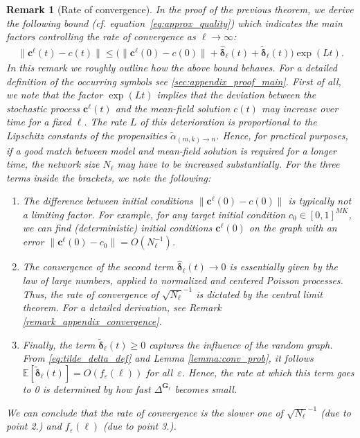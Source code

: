 \documentclass[a4paper,
               10pt,
               pdftex,
               normalheadings,
               headsepline,
               footsepline,
               headinclude,
               footinclude,
               DIV=14,
               abstracton]
{scrartcl}
\newtheorem{remark}[theorem]{Remark}
\newcommand{\rv}[1]{\bm{#1}}
\newcommand{\review}[1]{{#1}}
\begin{document}
\review{
\begin{remark}[Rate of convergence]
    In the proof of the previous theorem, we derive the following bound (cf. equation~\eqref{eq:approx_quality}) which indicates the main factors controlling the rate of convergence as $\ell \to \infty$:
    \begin{align}
    \lVert \rv{c}^\ell(t) - c(t) \rVert \leq \Big(\lVert \rv{c}^\ell(0) - c(0) \rVert + \hat{\rv{\delta}}_\ell(t) + \rv{\tilde{\delta}}_\ell(t) \Big) \exp(L t).
\end{align}
In this remark we roughly outline how the above bound behaves. For a detailed definition of the occurring symbols see \cref{sec:appendix_proof_main}.
First of all, we note that the factor $\exp(L t)$ implies that the deviation between the stochastic process $\rv{c}^\ell(t)$ and the mean-field solution $c(t)$ may increase over time for a fixed $\ell$. The rate $L$ of this deterioration is proportional to the Lipschitz constants of the propensities $\tilde{\alpha}_{(m,k)\to n}$.
Hence, for practical purposes, if a good match between model and mean-field solution is required for a longer time, the network size $N_\ell$ may have to be increased substantially.
For the three terms inside the brackets, we note the following:
\begin{enumerate}
    \item The difference between initial conditions $\lVert \rv{c}^\ell(0) - c(0) \rVert$ is typically not a limiting factor. For example, for any target initial condition $c_0 \in [0,1]^{MK}$, we can find (deterministic) initial conditions $\rv{c}^\ell(0)$ on the graph with an error $\lVert \rv{c}^\ell(0) - c_0 \rVert = O(N_\ell^{-1})$.
    \item The convergence of the second term $\hat{\rv{\delta}}_\ell(t) \to 0$ is essentially given by the law of large numbers, applied to normalized and centered Poisson processes.
    Thus, the rate of convergence of $\sqrt{N_\ell}^{-1}$ is dictated by the central limit theorem.
    For a detailed derivation, see Remark \ref{remark_appendix_convergence}.
    \item Finally, the term $\rv{\tilde{\delta}}_\ell(t) \geq 0$ captures the influence of the random graph. From \eqref{eq:tilde_delta_def} and Lemma \ref{lemma:conv_prob}, it follows $\mathbb{E}[\rv{\tilde{\delta}}_\ell(t)] = O(f_\varepsilon(\ell))$ for all~$\varepsilon$. Hence, the rate at which this term goes to 0 is determined by how fast $\Delta^{\rv{G}_\ell}$ becomes small.
\end{enumerate}
We can conclude that the rate of convergence is the slower one of $\sqrt{N_\ell}^{-1}$ (due to point 2.) and $f_\varepsilon(\ell)$ (due to point 3.).
\end{remark}
}
\end{document}
